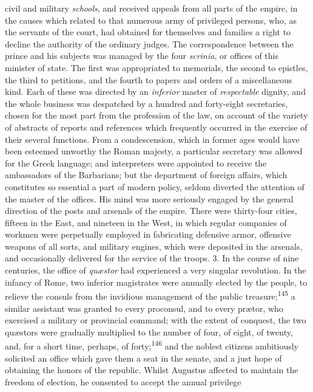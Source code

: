 civil and military \textit{schools}, and received appeals from all parts
of the empire, in the causes which related to that numerous army
of privileged persons, who, as the servants of the court, had
obtained for themselves and families a right to decline the
authority of the ordinary judges. The correspondence between the
prince and his subjects was managed by the four \textit{scrinia}, or
offices of this minister of state. The first was appropriated to
memorials, the second to epistles, the third to petitions, and
the fourth to papers and orders of a miscellaneous kind. Each of
these was directed by an \textit{inferior} master of \textit{respectable}
dignity, and the whole business was despatched by a hundred and
forty-eight secretaries, chosen for the most part from the
profession of the law, on account of the variety of abstracts of
reports and references which frequently occurred in the exercise
of their several functions. From a condescension, which in former
ages would have been esteemed unworthy the Roman majesty, a
particular secretary was allowed for the Greek language; and
interpreters were appointed to receive the ambassadors of the
Barbarians; but the department of foreign affairs, which
constitutes so essential a part of modern policy, seldom diverted
the attention of the master of the offices. His mind was more
seriously engaged by the general direction of the posts and
arsenals of the empire. There were thirty-four cities, fifteen in
the East, and nineteen in the West, in which regular companies of
workmen were perpetually employed in fabricating defensive armor,
offensive weapons of all sorts, and military engines, which were
deposited in the arsenals, and occasionally delivered for the
service of the troops. 3. In the course of nine centuries, the
office of \textit{quæstor} had experienced a very singular revolution.
In the infancy of Rome, two inferior magistrates were annually
elected by the people, to relieve the consuls from the invidious
management of the public treasure;\textsuperscript{145} a similar assistant was
granted to every proconsul, and to every prætor, who exercised a
military or provincial command; with the extent of conquest, the
two quæstors were gradually multiplied to the number of four, of
eight, of twenty, and, for a short time, perhaps, of forty;\textsuperscript{146}
and the noblest citizens ambitiously solicited an office which
gave them a seat in the senate, and a just hope of obtaining the
honors of the republic. Whilst Augustus affected to maintain the
freedom of election, he consented to accept the annual privilege

